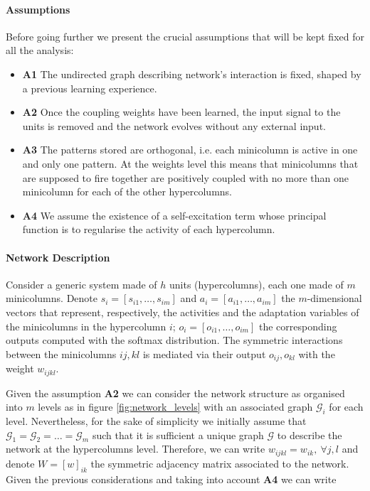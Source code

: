 \paragraph{Assumptions}
Before going further we present the crucial assumptions that will be kept fixed for all the analysis:
 \begin{itemize}
     \item \textbf{A1} The undirected graph describing network's interaction is fixed, shaped by a previous learning experience.
     \item \textbf{A2} Once the coupling weights have been learned, the input signal to the units is removed and the network evolves without any external input.
     \item \textbf{A3} The patterns stored are orthogonal, i.e. each minicolumn is active in one and only one pattern. At the weights level this means that minicolumns that are supposed to fire together are positively coupled with no more than one minicolumn for each of the other hypercolumns. 
     \item \textbf{A4} We assume the existence of a self-excitation term whose principal function is to regularise the activity of each hypercolumn. 
 \end{itemize}
 
\paragraph{Network Description}
Consider a generic system made of $h$ units (hypercolumns), each one made of $m$ minicolumns. Denote $s_i = [s_{i1}, \dots, s_{im}]$ and $a_i = [a_{i1}, \dots, a_{im}]$ the $m$-dimensional vectors that represent, respectively, the activities and the adaptation variables of the minicolumns in the hypercolumn $i$; $o_i = [o_{i1}, \dots, o_{im}]$ the corresponding outputs computed with the softmax distribution. The symmetric interactions between the minicolumns $ij, kl$ is mediated via their output $o_{ij}, o_{kl}$ with the weight \textbf{$w_{ijkl}$}.

Given the assumption \textbf{A2} we can consider the network structure as organised into $m$ levels as in figure \cref{fig:network_levels} with an associated graph $\mathcal{G}_i$ for each level. Nevertheless, for the sake of simplicity we initially assume that $\mathcal{G}_1 = \mathcal{G}_2 = \dots = \mathcal{G}_m$ such that it is sufficient a unique graph $\mathcal{G}$ to describe the network at the hypercolumns level. Therefore, we can write $w_{ijkl}=w_{ik},\ \forall j, l$ and denote $W =\left[w\right]_{ik}$ the symmetric adjacency matrix associated to the network. Given the previous considerations and taking into account \textbf{A4} we can write

